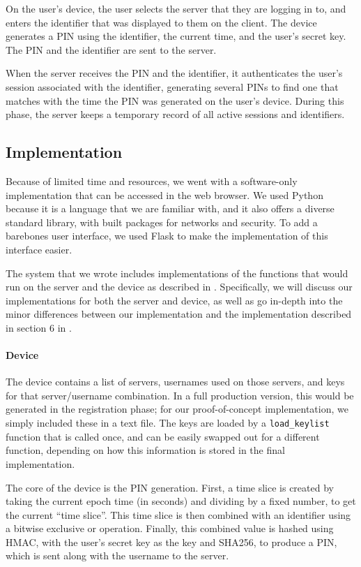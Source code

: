 \documentclass[11pt]{article}
\begin{document}
On the user's device, the user selects the server that they are logging
in to, and enters the identifier that was displayed to them on the
client. The device generates a PIN using the identifier, the current
time, and the user's secret key. The PIN and the identifier are sent to
the server.

When the server receives the PIN and the identifier, it authenticates
the user's session associated with the identifier, generating several
PINs to find one that matches with the time the PIN was generated on the
user's device. During this phase, the server keeps a temporary record of
all active sessions and identifiers.

\subsection{Implementation}

Because of limited time and resources, we went with a software-only
implementation that can be accessed in the web browser. We used Python
because it is a language that we are familiar with, and it also offers a
diverse standard library, with built packages for networks and security.
To add a barebones user interface, we used Flask to make the
implementation of this interface easier. 

The system that we wrote includes implementations of the functions that
would run on the server and the device as described in
\cite{shirvanian2d2fa}. Specifically, we will discuss our
implementations for both the server and device, as well as go in-depth
into the minor differences between our implementation and the
implementation described in section 6 in \cite{shirvanian2d2fa}.

\paragraph{Device}

The device contains a list of servers, usernames used on those servers,
and keys for that server/username combination. In a full production
version, this would be generated in the registration phase; for our
proof-of-concept implementation, we simply included these in a text
file. The keys are loaded by a \texttt{load\_keylist} function that is
called once, and can be easily swapped out for a different function,
depending on how this information is stored in the final implementation.

The core of the device is the PIN generation. First, a time slice is
created by taking the current epoch time (in seconds) and dividing by a
fixed number, to get the current ``time slice''. This time slice is then
combined with an identifier using a bitwise exclusive or operation.
Finally, this combined value is hashed using HMAC, with the user's
secret key as the key and SHA256, to produce a PIN, which is sent along
with the username to the server.
\end{document}
